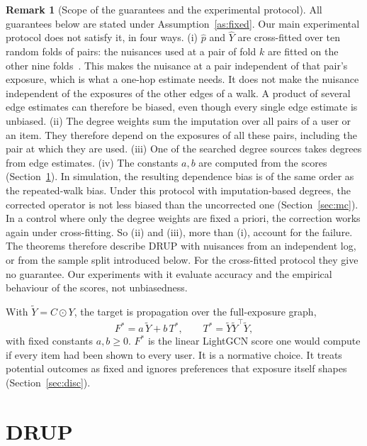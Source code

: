 \documentclass[preprint,review,12pt,authoryear]{elsarticle}
\theoremstyle{definition}
\newtheorem{remark}{Remark}
\newcommand{\tY}{\tilde Y}
\begin{document}
\begin{remark}[Scope of the guarantees and the experimental protocol]\label{rem:xfit}
All guarantees below are stated under Assumption~\ref{as:fixed}. Our main
experimental protocol does not satisfy it, in four ways. (i) $\hat p$ and
$\hat Y$ are cross-fitted over ten random folds of pairs: the nuisances used at
a pair of fold $k$ are fitted on the other nine
folds~\citep{chernozhukov2018dml}. This makes the nuisance at a pair
independent of that pair's exposure, which is what a one-hop estimate needs.
It does not make the nuisance independent of the exposures of the other edges
of a walk. A product of several edge estimates can therefore be biased, even
though every single edge estimate is unbiased. (ii) The degree weights sum the
imputation over all pairs of a user or an item. They therefore depend on the
exposures of all these pairs, including the pair at which they are used.
(iii) One of the searched degree sources takes degrees from edge estimates.
(iv) The constants $a,b$ are computed from the
scores (Section~\ref{sec:drup}). In simulation, the resulting dependence bias
is of the same order as the repeated-walk bias. Under this protocol with
imputation-based degrees, the corrected operator is not less biased than the
uncorrected one
(Section~\ref{sec:mc}). In a control where only the degree weights are fixed a
priori, the correction works again under cross-fitting. So (ii) and (iii), more
than (i), account for the failure. The theorems therefore describe DRUP with
nuisances from an independent log, or from the sample split introduced below.
For the cross-fitted protocol they give no guarantee. Our experiments with it
evaluate accuracy and the empirical behaviour of the scores, not
unbiasedness.
\end{remark}

With $\tY=C\odot Y$, the target is propagation over the full-exposure graph,
\begin{equation}\label{eq:target}
F^*=a\,\tY+b\,T^*,\qquad T^*=\tY\tY^\top\tY ,
\end{equation}
with fixed constants $a,b\ge0$. $F^*$ is the linear LightGCN score one would
compute if every item had been shown to every user. It is a normative choice.
It treats potential outcomes as fixed and ignores preferences that exposure
itself shapes~\citep{chaney2018confounding,perdomo2020performative}
(Section~\ref{sec:disc}).

\section{DRUP}\label{sec:drup}
\end{document}
